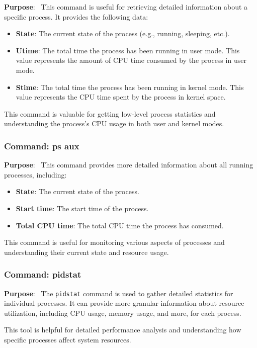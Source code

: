 \documentclass[12pt]{article}
\begin{document}
\textbf{Purpose}: \
This command is useful for retrieving detailed information about a specific process. It provides the following data:

\begin{itemize}
    \item \textbf{State}: The current state of the process (e.g., running, sleeping, etc.).
    \item \textbf{Utime}: The total time the process has been running in user mode. This value represents the amount of CPU time consumed by the process in user mode.
    \item \textbf{Stime}: The total time the process has been running in kernel mode. This value represents the CPU time spent by the process in kernel space.
\end{itemize}

This command is valuable for getting low-level process statistics and understanding the process's CPU usage in both user and kernel modes.

\subsubsection{Command: ps aux}

\textbf{Purpose}: \
This command provides more detailed information about all running processes, including:

\begin{itemize}
    \item \textbf{State}: The current state of the process.
    \item \textbf{Start time}: The start time of the process.
    \item \textbf{Total CPU time}: The total CPU time the process has consumed.
\end{itemize}

This command is useful for monitoring various aspects of processes and understanding their current state and resource usage.

\subsubsection{Command: pidstat}

\textbf{Purpose}: \
The \texttt{pidstat} command is used to gather detailed statistics for individual processes. It can provide more granular information about resource utilization, including CPU usage, memory usage, and more, for each process.

This tool is helpful for detailed performance analysis and understanding how specific processes affect system resources.
\end{document}
